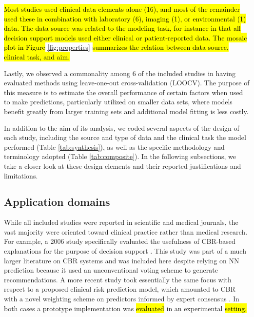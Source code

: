 \documentclass[sn-mathphys,Numbered,pdflatex]{sn-jnl}
\theoremstyle{remark}
\theoremstyle{definition}
\begin{document}
\hl{Most studies used clinical data elements alone
(16),
and most of the remainder used these in combination with laboratory
(6),
imaging
(1),
or environmental
(1)
data. The data source was related to the modeling task, for instance in that all decision support models used either clinical or patient-reported data.
The mosaic plot in Figure }\ref{fig:properties}\hl{ summarizes the relation between data source, clinical task, and aim.}

Lastly, we observed a commonality among 6 of the included studies in
having evaluated methods using leave-one-out cross-validation (LOOCV).
The purpose of this measure is to estimate the overall performance of
certain factors when used to make predictions, particularly utilized on
smaller data sets, where models benefit greatly from larger training
sets and additional model fitting is less costly.

In addition to the aim of its analysis, we coded several aspects of the
design of each study, including the source and type of data and the
clinical task the model performed (Table \ref{tab:synthesis}), as well
as the specific methodology and terminology adopted (Table
\ref{tab:composite}). In the following subsections, we take a closer
look at these design elements and their reported justifications and
limitations.

\subsection{Application domains}\label{application-domains}

While all included studies were reported in scientific and medical
journals, the vast majority were oriented toward clinical practice
rather than medical research. For example, a 2006 study specifically
evaluated the usefulness of CBR-based explanations for the purpose of
decision support \citep{Doyle2006}. This study was part of a much larger
literature on CBR systems and was included here despite relying on NN
prediction because it used an unconventional voting scheme to generate
recommendations. A more recent study took essentially the same focus
with respect to a proposed clinical risk prediction model, which
amounted to CBR with a novel weighting scheme on predictors informed by
expert consensus \citep{Fang2021}. In both cases a prototype
implementation was \hl{evaluated} in an experimental \hl{setting.}
\end{document}

